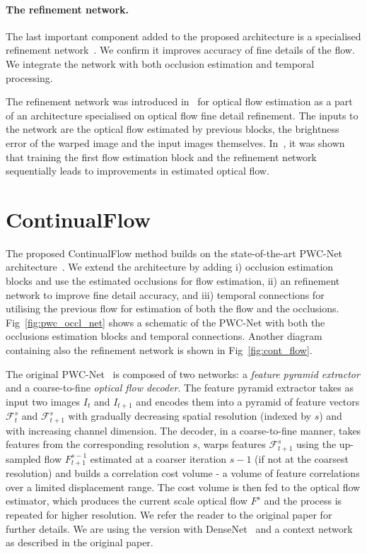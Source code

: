 \documentclass[runningheads]{llncs}
\begin{document}
\paragraph{\bf The refinement network.} The last important component added to the proposed architecture is a specialised refinement network~\cite{Ilg2016,Pang2017}.
We confirm it improves accuracy of fine details of the flow. We integrate the network with both occlusion estimation and temporal processing.


The refinement network was introduced in~\cite{Ilg2016} for optical flow estimation as a part of an architecture specialised on optical flow fine detail refinement.
The inputs to the network are the optical flow estimated by previous blocks, the brightness error of the warped image and the input images themselves.
In~\cite{Ilg2016,Pang2017}, it was shown that training the first flow estimation block and the refinement network sequentially leads to improvements in estimated optical flow.

 


\section{ContinualFlow}
\label{sec:proposed}
The proposed ContinualFlow method builds on the state-of-the-art  PWC-Net architecture~\cite{Sun2017}. We extend the architecture by adding i) occlusion estimation blocks and use the estimated occlusions for flow estimation, ii) an refinement network to improve fine detail accuracy, and iii)  temporal connections for utilising the previous flow for estimation of both the flow and the occlusions. Fig~\ref{fig:pwc_occl_net} shows a schematic of the PWC-Net with both the occlusions estimation blocks and temporal connections. Another diagram containing also the refinement network is shown in Fig~\ref{fig:cont_flow}.

The original PWC-Net~\cite{Sun2017} is composed of two networks: a {\it feature pyramid extractor} and a coarse-to-fine {\it optical flow decoder}.
The feature pyramid extractor takes as input two images $I_t$ and $I_{t+1}$ and encodes them into a pyramid of feature vectors $\mathcal{F}_t^s$ and $\mathcal{F}_{t+1}^s$ with gradually decreasing spatial resolution (indexed by $s$) and with increasing channel dimension. The decoder, in a coarse-to-fine manner, takes features from the corresponding resolution $s$, warps features $\mathcal{F}_{t+1}^s$ using the up-sampled flow $F_{t+1}^{s-1}$ estimated at a coarser iteration $s-1$ (if not at the coarsest resolution) and builds a correlation cost volume - a volume of feature correlations over a limited displacement range. The cost volume is then fed to the optical flow estimator, which produces the current scale optical flow $F^s$ and the process is repeated for higher resolution. We refer the reader to the original paper for further details. We are using the version with DenseNet~\cite{Huang2016} and a context network as described in the original paper.
\end{document}
